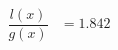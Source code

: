 \documentclass[preview]{standalone}
\begin{document}
\begin{align*}
\dfrac{l(x)}{g(x)} &= 1.842
\end{align*}
\end{document}
